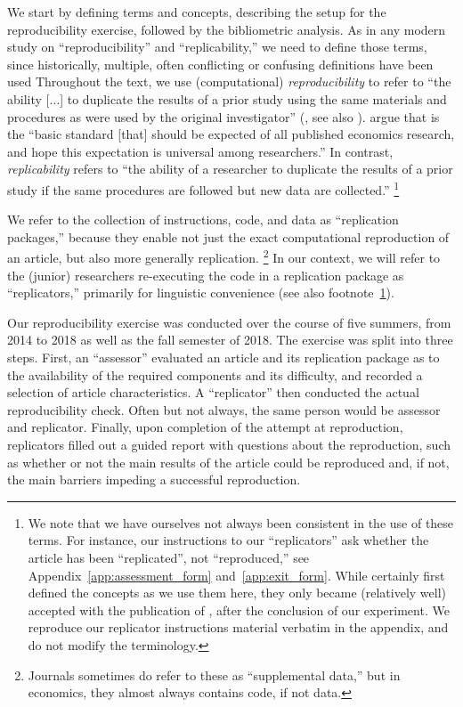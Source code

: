 \documentclass{cje} %
\theoremstyle{plain}%
\theoremstyle{definition}
\theoremstyle{remark}
\begin{document}
We start by defining  terms and concepts, describing the setup for the reproducibility exercise, followed by the bibliometric analysis.
%
As in any modern study on ``reproducibility'' and ``replicability,'' we need to define those terms, since historically, multiple, often conflicting or confusing definitions have been used \citep{Pesaran2003,Hamermesh2007,Bollen2015-vb,Clemens2015,nasem2019}
%
Throughout the text, we use (computational) \textit{reproducibility} to refer to ``the ability [$\dots$] to duplicate the results of a prior study using the same materials and procedures as were used by the original investigator'' (\citet{Bollen2015-vb}, see also \citet{nasem2019}). \cite[p. 942]{Christensen2018} argue that is the ``basic standard [that] should be expected of all published economics research, and hope this expectation is universal among researchers.'' In contrast, \textit{replicability} refers to ``the ability of a researcher to duplicate the results of a prior study if the same procedures are followed but new data are collected.''%
%
\footnote{\label{fn:confusion}We note that we have ourselves not always been consistent in the use of these terms. For instance, our instructions to our ``replicators'' ask whether the article has been ``replicated'', not ``reproduced,'' see Appendix~\ref{app:assessment_form} and~\ref{app:exit_form}. While \citet{Bollen2015-vb} certainly first defined the concepts as we use them here, they only became (relatively well) accepted with the publication of \citet{nasem2019}, after the conclusion of our experiment. We reproduce our replicator instructions material verbatim in the appendix, and do not modify the terminology.}

We refer to the collection of instructions, code, and data as ``replication packages,'' because they enable not just the exact computational reproduction of an article, but also more generally replication.%
%
\footnote{Journals sometimes do refer to these as ``supplemental data,'' but in economics, they almost always contains code, if not data.}
%
In our context, we will refer to the (junior) researchers re-executing the code in a replication package as ``replicators,'' primarily for linguistic convenience (see also footnote~\ref{fn:confusion}).

%
%
 
Our reproducibility exercise was conducted over the course of five summers, from 2014 to 2018 as well as the fall semester of 2018. The exercise was split into three steps.  
%
First, an ``assessor'' evaluated an article and its replication package as to the availability of the required components and its difficulty, and recorded a selection of article characteristics. A ``replicator'' then conducted the actual reproducibility check. Often but not always, the same person would be assessor and replicator. Finally, upon completion of the attempt at reproduction, replicators filled out a guided report with questions about the reproduction, such as whether or not the main results of the article could be reproduced and, if not, the main barriers impeding a successful reproduction. 
\end{document}
